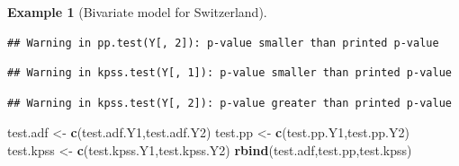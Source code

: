 \documentclass[
  11pt,
]{book}
\newenvironment{Shaded}{\begin{snugshade}}{\end{snugshade}}
\newcommand{\AttributeTok}[1]{\textcolor[rgb]{0.13,0.29,0.53}{#1}}
\newcommand{\DecValTok}[1]{\textcolor[rgb]{0.00,0.00,0.81}{#1}}
\newcommand{\FunctionTok}[1]{\textcolor[rgb]{0.13,0.29,0.53}{\textbf{#1}}}
\newcommand{\NormalTok}[1]{#1}
\newcommand{\OtherTok}[1]{\textcolor[rgb]{0.56,0.35,0.01}{#1}}
\newcommand{\SpecialCharTok}[1]{\textcolor[rgb]{0.81,0.36,0.00}{\textbf{#1}}}
\theoremstyle{definition}
\theoremstyle{definition}
\newtheorem{example}{Example}[chapter]
\theoremstyle{definition}
\theoremstyle{definition}
\theoremstyle{remark}
\begin{document}
\begin{example}[Bivariate model for Switzerland]
\begin{Shaded}
\end{Shaded}

\begin{verbatim}
## Warning in pp.test(Y[, 2]): p-value smaller than printed p-value
\end{verbatim}

\begin{Shaded}
\end{Shaded}

\begin{verbatim}
## Warning in kpss.test(Y[, 1]): p-value smaller than printed p-value
\end{verbatim}

\begin{Shaded}
\end{Shaded}

\begin{verbatim}
## Warning in kpss.test(Y[, 2]): p-value greater than printed p-value
\end{verbatim}

\begin{Shaded}
\begin{Highlighting}[]
\NormalTok{test.adf  }\OtherTok{\textless{}{-}} \FunctionTok{c}\NormalTok{(test.adf.Y1,test.adf.Y2)}
\NormalTok{test.pp   }\OtherTok{\textless{}{-}} \FunctionTok{c}\NormalTok{(test.pp.Y1,test.pp.Y2)}
\NormalTok{test.kpss }\OtherTok{\textless{}{-}} \FunctionTok{c}\NormalTok{(test.kpss.Y1,test.kpss.Y2)}
\FunctionTok{rbind}\NormalTok{(test.adf,test.pp,test.kpss)}
\end{Highlighting}
\end{Shaded}


\end{example}
\end{document}
